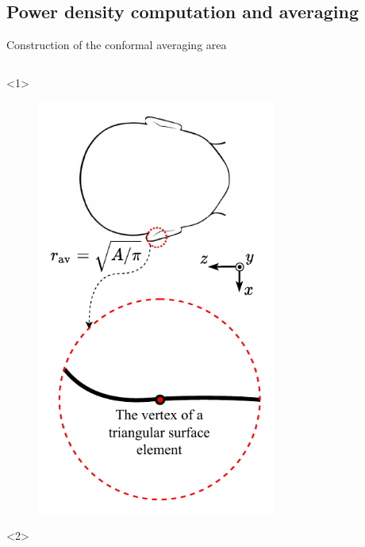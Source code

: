 \documentclass[xcolor=dvipsnames,10pt]{beamer}
\begin{document}
\subsection{Power density computation and averaging}
\begin{frame}{Construction of the conformal averaging area}
    \begin{columns}[c]
        \begin{column}{0.5\textwidth}
            \begin{onlyenv}<1>
                \begin{center}
                \begin{figure}
                    \includegraphics[width=0.7\textwidth]{artwork/averaging_area_construction.iec.pdf}
                \end{figure}
                \end{center}
            \end{onlyenv}
            \begin{onlyenv}<2>
                \begin{center}
                \begin{figure}

\end{figure}
\end{center}
\end{onlyenv}
\end{column}
\end{columns}
\end{frame}
\end{document}
